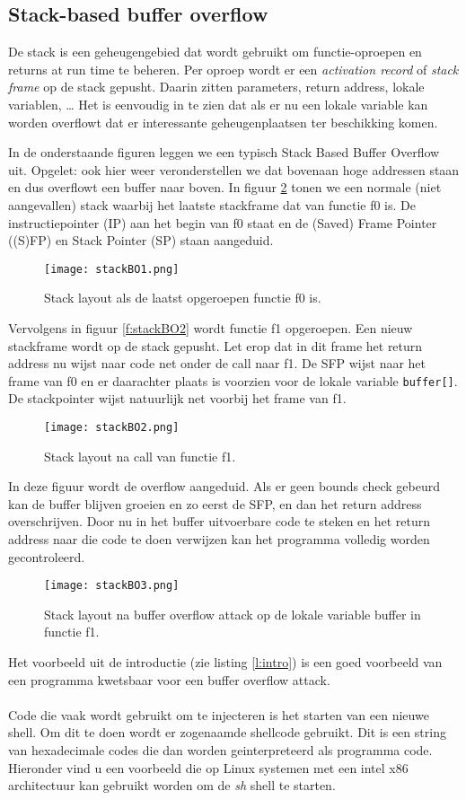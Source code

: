 \documentclass[../main.tex]{subfiles}
\begin{document}
\subsection{Stack-based buffer overflow}
De stack is een geheugengebied dat wordt gebruikt om functie-oproepen en returns at run time te beheren.
Per oproep wordt er een \emph{activation record} of \emph{stack frame} op de stack gepusht. Daarin zitten parameters, return address, lokale variablen, \ldots
Het is eenvoudig in te zien dat als er nu een lokale variable kan worden overflowt dat er interessante geheugenplaatsen ter beschikking komen.

In de onderstaande figuren leggen we een typisch Stack Based Buffer Overflow uit. Opgelet: ook hier weer veronderstellen we dat bovenaan hoge addressen staan en dus overflowt een buffer naar boven.
In figuur \ref{f:stackBO1} tonen we een normale (niet aangevallen) stack waarbij het laatste stackframe dat van functie f0 is. De instructiepointer (IP) aan het begin van f0 staat en de (Saved) Frame Pointer ((S)FP) en Stack Pointer (SP) staan aangeduid.
\begin{figure}
\centering
\texttt{[image: stackBO1.png]}
\caption{Stack layout als de laatst opgeroepen functie f0 is.}
\label{f:stackBO1}
\end{figure}

Vervolgens in figuur \ref{f:stackBO2} wordt functie f1 opgeroepen. Een nieuw stackframe wordt op de stack gepusht. Let erop dat in dit frame het return address nu wijst naar code net onder de call naar f1. De SFP wijst naar het frame van f0 en er daarachter plaats is voorzien voor de lokale variable \lstinline[style=ilcstyle]{buffer[]}. De stackpointer wijst natuurlijk net voorbij het frame van f1.
\begin{figure}
\centering
\texttt{[image: stackBO2.png]}
\caption{Stack layout na call van functie f1.}
\label{f:stackBO1}
\end{figure}

In deze figuur wordt de overflow aangeduid. Als er geen bounds check gebeurd kan de buffer blijven groeien en zo eerst de SFP, en dan het return address overschrijven. Door nu in het buffer uitvoerbare code te steken en het return address naar die code te doen verwijzen kan het programma volledig worden gecontroleerd.
\begin{figure}
\centering
\texttt{[image: stackBO3.png]}
\caption{Stack layout na buffer overflow attack op de lokale variable buffer in functie f1.}
\label{f:stackBO3}
\end{figure}
Het voorbeeld uit de introductie (zie listing \ref{l:intro}) is een goed voorbeeld van een programma kwetsbaar voor een buffer overflow attack.
\\\\
Code die vaak wordt gebruikt om te injecteren is het starten van een nieuwe shell.
Om dit te doen wordt er zogenaamde shellcode gebruikt.
Dit is een string van hexadecimale codes die dan worden geinterpreteerd als programma code.
Hieronder vind u een voorbeeld die op Linux systemen met een intel x86 architectuur kan gebruikt worden om de \emph{sh} shell te starten.
\end{document}
